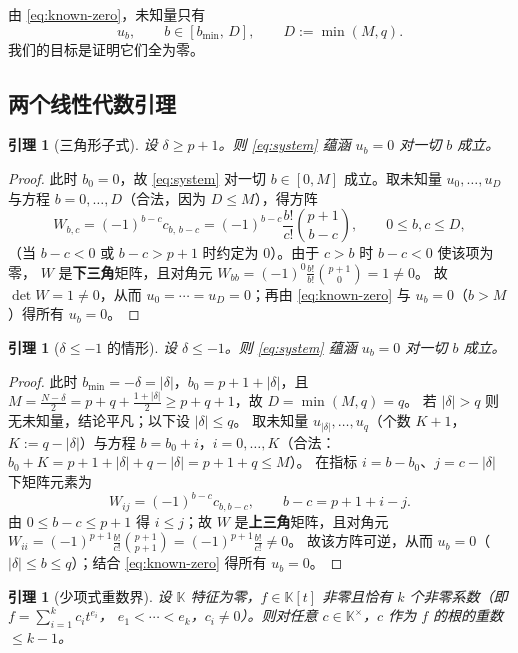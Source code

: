 \documentclass[11pt,UTF8]{ctexart}
\newtheorem{lemma}[theorem]{引理}
\theoremstyle{definition}
\newcommand{\K}{\mathbb{K}}
\begin{document}
由 \eqref{eq:known-zero}，未知量只有
\[
u_b,\qquad b\in[b_{\min},\,D],\qquad D:=\min(M,q).
\]
我们的目标是证明它们全为零。

\subsection{两个线性代数引理}

\begin{lemma}[三角形子式]\label{lem:triangular}
设 $\delta\ge p+1$。则 \eqref{eq:system} 蕴涵 $u_b=0$ 对一切 $b$ 成立。
\end{lemma}

\begin{proof}
此时 $b_0=0$，故 \eqref{eq:system} 对一切 $b\in[0,M]$ 成立。取未知量 $u_0,\dots,u_D$
与方程 $b=0,\dots,D$（合法，因为 $D\le M$），得方阵
\[
W_{b,c}=(-1)^{b-c}c_{b,\,b-c}=(-1)^{b-c}\frac{b!}{c!}\binom{p+1}{b-c},
\qquad 0\le b,c\le D ,
\]
（当 $b-c<0$ 或 $b-c>p+1$ 时约定为 $0$）。由于 $c>b$ 时 $b-c<0$ 使该项为零，
$W$ 是\textbf{下三角}矩阵，且对角元 $W_{bb}=(-1)^0\frac{b!}{b!}\binom{p+1}{0}=1\ne0$。
故 $\det W=1\ne0$，从而 $u_0=\cdots=u_D=0$；再由 \eqref{eq:known-zero} 与 $u_b=0$（$b>M$）得所有 $u_b=0$。
\end{proof}

\begin{lemma}[$\delta\le-1$ 的情形]\label{lem:negative}
设 $\delta\le-1$。则 \eqref{eq:system} 蕴涵 $u_b=0$ 对一切 $b$ 成立。
\end{lemma}

\begin{proof}
此时 $b_{\min}=-\delta=|\delta|$，$b_0=p+1+|\delta|$，且
$M=\frac{N-\delta}{2}=p+q+\frac{1+|\delta|}{2}\ge p+q+1$，故 $D=\min(M,q)=q$。
若 $|\delta|>q$ 则无未知量，结论平凡；以下设 $|\delta|\le q$。
取未知量 $u_{|\delta|},\dots,u_{q}$（个数 $K+1$，$K:=q-|\delta|$）与方程
$b=b_0+i$，$i=0,\dots,K$（合法：$b_0+K=p+1+|\delta|+q-|\delta|=p+1+q\le M$）。
在指标 $i=b-b_0$、$j=c-|\delta|$ 下矩阵元素为
\[
W_{ij}=(-1)^{b-c}c_{b,b-c},\qquad b-c=p+1+i-j .
\]
由 $0\le b-c\le p+1$ 得 $i\le j$；故 $W$ 是\textbf{上三角}矩阵，且对角元
$W_{ii}=(-1)^{p+1}\frac{b!}{c!}\binom{p+1}{p+1}=(-1)^{p+1}\frac{b!}{c!}\ne0$。
故该方阵可逆，从而 $u_b=0$（$|\delta|\le b\le q$）；结合 \eqref{eq:known-zero} 得所有 $u_b=0$。
\end{proof}

\begin{lemma}[少项式重数界]\label{lem:fewnomial}
设 $\K$ 特征为零，$f\in\K[t]$ 非零且恰有 $k$ 个非零系数（即 $f=\sum_{i=1}^{k}c_it^{e_i}$，
$e_1<\cdots<e_k$，$c_i\ne0$）。则对任意 $c\in\K^{\times}$，$c$ 作为 $f$ 的根的重数 $\le k-1$。
\end{lemma}
\end{document}
